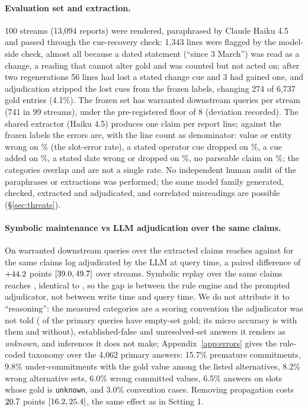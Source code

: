 \paragraph{Evaluation set and extraction.} 100 streams (13{,}094 reports) were rendered, paraphrased by Claude Haiku 4.5 and passed through the cue-recovery check: 1{,}343 lines were flagged by the model-side check, almost all because a dated statement (``since 3 March'') was read as a change, a reading that cannot alter gold and was counted but not acted on; after two regenerations 56 lines had lost a stated change cue and 3 had gained one, and adjudication stripped the lost cues from the frozen labels, changing 274 of 6{,}737 gold entries (4.1\%). The frozen set has \sTwoWarrPerStream{} warranted downstream queries per stream (741 in 99 streams), under the pre-registered floor of 8 (deviation recorded). The shared extractor (Haiku 4.5) produces one claim per report line; against the frozen labels the errors are, with the line count as denominator: value or entity wrong on \sTwoExtSlot\% (the slot-error rate), a stated operator cue dropped on \sTwoExtMissed\%, a cue added on \sTwoExtSpur\%, a stated date wrong or dropped on \sTwoExtValid\%, no parseable claim on \sTwoExtFail\%; the categories overlap and are not a single rate. No independent human audit of the paraphrases or extractions was performed; the same model family generated, checked, extracted and adjudicated, and correlated misreadings are possible (\S\ref{sec:threats}).

\paragraph{Symbolic maintenance vs LLM adjudication over the same claims.} On warranted downstream queries \pal{} over the extracted claims reaches \sTwoPalWarr{} against \sTwoLogWarr{} for the same claims log adjudicated by the LLM at query time, a paired difference of $+44.2$ points $[39.0, 49.7]$ over \sTwoHOneN{} streams. Symbolic replay over the same claims reaches \sTwoRuleWarr{}, identical to \pal, so the gap is between the rule engine and the prompted adjudicator, not between write time and query time. We do not attribute it to ``reasoning'': the measured categories are a scoring convention the adjudicator was not told (\primEmpty{} of the \primN{} primary queries have empty-set gold; its micro accuracy is \primLogExact{} with them and \primLogExactNe{} without), established-false and unresolved-set answers it renders as \emph{unknown}, and inferences it does not make; Appendix~\ref{app:errors} gives the rule-coded taxonomy over the 4{,}062 primary answers: 15.7\% premature commitments, 9.8\% under-commitments with the gold value among the listed alternatives, 8.2\% wrong alternative sets, 6.0\% wrong committed values, 6.5\% answers on slots whose gold is \texttt{unknown}, and 3.0\% convention cases. Removing propagation costs $20.7$ points $[16.2, 25.4]$, the same effect as in Setting 1.

